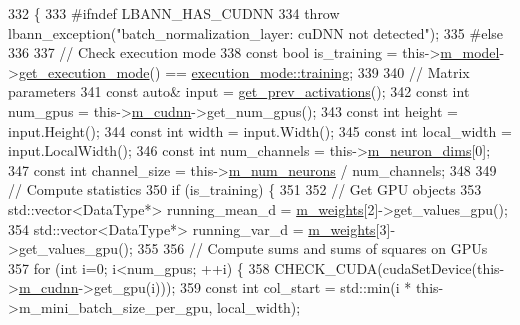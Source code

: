 \begin{DoxyCode}
332                         \{
333 \textcolor{preprocessor}{  #ifndef LBANN\_HAS\_CUDNN}
334     \textcolor{keywordflow}{throw} lbann\_exception(\textcolor{stringliteral}{"batch\_normalization\_layer: cuDNN not detected"});
335 \textcolor{preprocessor}{  #else}
336 
337     \textcolor{comment}{// Check execution mode}
338     \textcolor{keyword}{const} \textcolor{keywordtype}{bool} is\_training = this->\hyperlink{classlbann_1_1Layer_a3d9315e99574166f2f33e37b572021d2}{m\_model}->\hyperlink{classlbann_1_1model_addb40597cf29aa6d31b6a7d09ef48608}{get\_execution\_mode}() == 
      \hyperlink{base_8hpp_a2781a159088df64ed7d47cc91c4dc0a8ac185ddac8b5a8f5aa23c5b80bc12d214}{execution\_mode::training};
339 
340     \textcolor{comment}{// Matrix parameters}
341     \textcolor{keyword}{const} \textcolor{keyword}{auto}& input = \hyperlink{classlbann_1_1Layer_a45853df73a2e72bfaa774665a0f37ed7}{get\_prev\_activations}();
342     \textcolor{keyword}{const} \textcolor{keywordtype}{int} num\_gpus = this->\hyperlink{classlbann_1_1Layer_a08dbb94239e3b8c96329786c57c72e21}{m\_cudnn}->get\_num\_gpus();
343     \textcolor{keyword}{const} \textcolor{keywordtype}{int} height = input.Height();
344     \textcolor{keyword}{const} \textcolor{keywordtype}{int} width = input.Width();
345     \textcolor{keyword}{const} \textcolor{keywordtype}{int} local\_width = input.LocalWidth();
346     \textcolor{keyword}{const} \textcolor{keywordtype}{int} num\_channels = this->\hyperlink{classlbann_1_1Layer_abb34bb8031f57a483e2e327a5f229f48}{m\_neuron\_dims}[0];
347     \textcolor{keyword}{const} \textcolor{keywordtype}{int} channel\_size = this->\hyperlink{classlbann_1_1Layer_a6b5ebc8a7d9329d8a773ed787e7b41d8}{m\_num\_neurons} / num\_channels;
348 
349     \textcolor{comment}{// Compute statistics}
350     \textcolor{keywordflow}{if} (is\_training) \{
351 
352       \textcolor{comment}{// Get GPU objects}
353       std::vector<DataType*> running\_mean\_d = \hyperlink{classlbann_1_1Layer_a7954e30fbf9100a6ba4b56d02767a469}{m\_weights}[2]->get\_values\_gpu();
354       std::vector<DataType*> running\_var\_d = \hyperlink{classlbann_1_1Layer_a7954e30fbf9100a6ba4b56d02767a469}{m\_weights}[3]->get\_values\_gpu();
355 
356       \textcolor{comment}{// Compute sums and sums of squares on GPUs}
357       \textcolor{keywordflow}{for} (\textcolor{keywordtype}{int} i=0; i<num\_gpus; ++i) \{
358         CHECK\_CUDA(cudaSetDevice(this->\hyperlink{classlbann_1_1Layer_a08dbb94239e3b8c96329786c57c72e21}{m\_cudnn}->get\_gpu(i)));
359         \textcolor{keyword}{const} \textcolor{keywordtype}{int} col\_start = std::min(i * this->m\_mini\_batch\_size\_per\_gpu, local\_width);

\end{DoxyCode}
